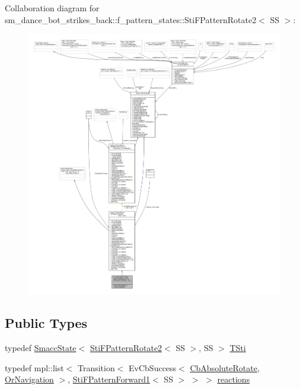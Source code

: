 Collaboration diagram for sm\+\_\+dance\+\_\+bot\+\_\+strikes\+\_\+back\+:\+:f\+\_\+pattern\+\_\+states\+:\+:Sti\+F\+Pattern\+Rotate2$<$ SS $>$\+:
\nopagebreak
\begin{figure}[H]
\begin{center}
\leavevmode
\includegraphics[width=350pt]{structsm__dance__bot__strikes__back_1_1f__pattern__states_1_1StiFPatternRotate2__coll__graph}
\end{center}
\end{figure}
\subsection*{Public Types}
\begin{DoxyCompactItemize}
\item 
typedef \hyperlink{classSmaccState}{Smacc\+State}$<$ \hyperlink{structsm__dance__bot__strikes__back_1_1f__pattern__states_1_1StiFPatternRotate2}{Sti\+F\+Pattern\+Rotate2}$<$ SS $>$, SS $>$ \hyperlink{structsm__dance__bot__strikes__back_1_1f__pattern__states_1_1StiFPatternRotate2_aed3f2c5cc7b21876329a8767f46d14a3}{T\+Sti}
\item 
typedef mpl\+::list$<$ Transition$<$ Ev\+Cb\+Success$<$ \hyperlink{classcl__move__base__z_1_1CbAbsoluteRotate}{Cb\+Absolute\+Rotate}, \hyperlink{classsm__dance__bot__strikes__back_1_1OrNavigation}{Or\+Navigation} $>$, \hyperlink{structsm__dance__bot__strikes__back_1_1f__pattern__states_1_1StiFPatternForward1}{Sti\+F\+Pattern\+Forward1}$<$ SS $>$ $>$ $>$ \hyperlink{structsm__dance__bot__strikes__back_1_1f__pattern__states_1_1StiFPatternRotate2_a38d675680103f33804a077e9f8fbec83}{reactions}
\end{DoxyCompactItemize}
